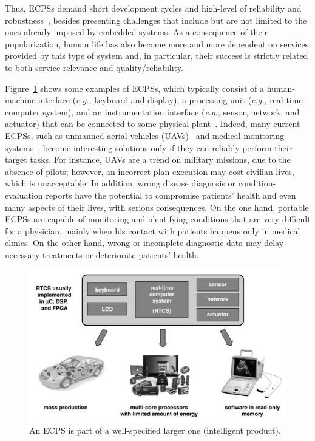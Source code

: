 \documentclass[format=acmsmall, review=false, screen=true]{acmart}
\begin{document}
Thus, ECPSs demand short development cycles and high-level of reliability and robustness~\cite{leeCPS,leeCPS2}, besides presenting challenges that include but are not limited to the ones already imposed by embedded systems. As a consequence of their popularization, human life has also become more and more dependent on services provided by this type of system and, in particular, their success is strictly related to both service relevance and quality/reliability. 

Figure~\ref{intelligent-product} shows some examples of ECPSs, which typically consist of a human-machine interface ({\it e.g.}, keyboard and display), a processing unit ({\it e.g.}, real-time computer system), and an instrumentation interface ({\it e.g.}, sensor, network, and actuator) that can be connected to some physical plant~\cite{Kopetz11}. Indeed, many current ECPSs, such as unmanned aerial vehicles (UAVs)~\cite{groza2015formal} and medical monitoring systems~\cite{Cordeiro09}, become interesting solutions only if they can reliably perform their target tasks. For instance, UAVs are a trend on military missions, due to the absence of pilots; however, an incorrect plan execution may cost civilian lives, which is unacceptable. In addition, wrong disease diagnosis or condition-evaluation reports have the potential to compromise patients' health and even many aspects of their lives, with serious consequences. On the one hand, portable ECPSs are capable of monitoring and identifying conditions that are very difficult for a physician, mainly when his contact with patients happens only in medical clinics. On the other hand, wrong or incomplete diagnostic data may delay necessary treatments or deteriorate patients' health. 
%
\begin{figure}[!t]
	\centering
	\includegraphics[width=\textwidth]{figure1.jpg}
	\caption{An ECPS is part of a well-specified larger one (intelligent product).}
	\label{intelligent-product}
\end{figure}
\end{document}
